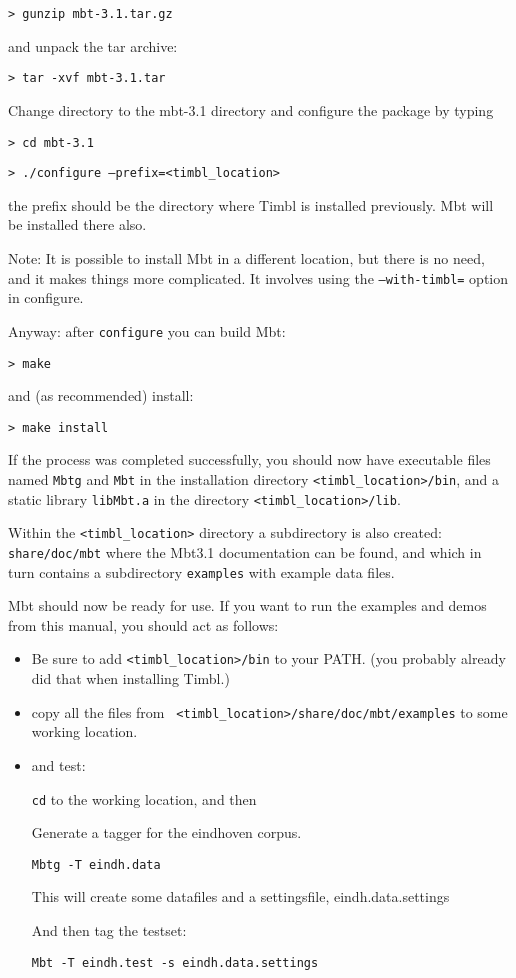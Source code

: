 \documentclass{report}
\begin{document}
{\tt > gunzip mbt-3.1.tar.gz}

and unpack the tar archive:

{\tt > tar -xvf mbt-3.1.tar}

Change directory to the mbt-3.1 directory and configure the package by typing

{\tt > cd mbt-3.1}

{\tt > ./configure --prefix=<timbl\_location>}

the prefix should be the directory where Timbl is installed previously. Mbt will
be installed there also.

Note: It is possible to install Mbt in a different location, but there
is no need, and it makes things more complicated. It involves using the
{\tt --with-timbl=} option in configure. 
 
Anyway: after {\tt configure} you can build Mbt:

{\tt > make}

and (as recommended) install:

{\tt > make install }

If the process was completed successfully, you should now have
executable files named {\tt Mbtg} and {\tt Mbt} in the installation directory
{\tt <timbl\_location>/bin}, and a static library {\tt libMbt.a} in
the directory {\tt <timbl\_location>/lib}.

Within the {\tt <timbl\_location>} directory a subdirectory is
also created: {\tt share/doc/mbt} where the Mbt3.1 documentation
can be found, and which in turn contains a subdirectory {\tt examples}
with example data files.

Mbt should now be ready for use. If you want to run the examples and
demos from this manual, you should act as follows:

\begin{itemize}
\item Be sure to add {\tt <timbl\_location>/bin} to your PATH. (you
  probably already did that when installing Timbl.)
\item copy all the files from {\tt
  <timbl\_location>/share/doc/mbt/examples} to some working
location. 
\item and test:

{\tt cd} to the working location, and then

Generate a tagger for the eindhoven corpus.

{\tt Mbtg -T eindh.data}

This will create some datafiles and a settingsfile,
eindh.data.settings

And then tag the testset:

{\tt Mbt -T eindh.test -s eindh.data.settings}
\end{itemize}
\end{document}
